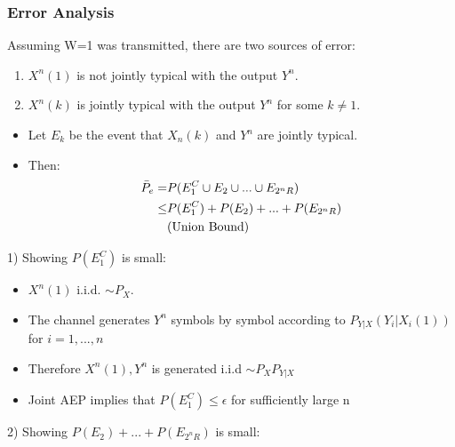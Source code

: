 \documentclass[12pt]{article}
\begin{document}
\subsubsection{Error Analysis}
Assuming W=1 was transmitted, there are two sources of error:
\begin{enumerate}
    \item $X^n(1)$ is not jointly typical with the output $Y^n$.
    \item $X^n(k)$ is jointly typical with the output $Y^n$ for some $k \not = 1$.
\end{enumerate}
\begin{itemize}
    \item Let $E_k$ be the event that $X_n(k)$ and $Y^n$ are jointly typical.
    \item Then:
    \begin{align*}
        \Bar{P}_e =& P(E_1^C \cup E_2 \cup ... \cup E_{2^nR})\\
        \le & P(E_1^C) + P(E_2) + ... + P(E_{2^nR}) \\
        &\textrm{(Union Bound)}
    \end{align*}
\end{itemize}
1) Showing $P(E_1^C)$ is small:
\begin{itemize}
    \item $X^n(1)$ i.i.d. $\sim P_X$.
    \item The channel generates $Y^n$ symbols by symbol according to $P_{Y|X}(Y_i|X_i(1))$ for $i=1,...,n$
    \item Therefore $X^n(1), Y^n$ is generated i.i.d $\sim P_X P_{Y|X}$
    \item Joint AEP implies that $P(E_1^C) \le \epsilon$ for sufficiently large n 
\end{itemize}
2) Showing $ P(E_2) + ... + P(E_{2^nR})$ is small:
\end{document}
